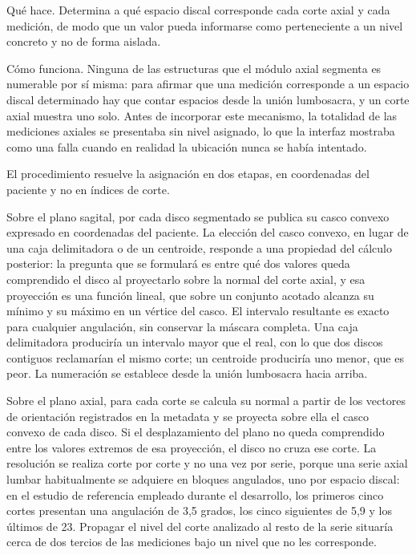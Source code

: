 Qué hace. Determina a qué espacio discal corresponde cada corte axial y cada medición, de modo que un valor pueda informarse como perteneciente a un nivel concreto y no de forma aislada.

Cómo funciona. Ninguna de las estructuras que el módulo axial segmenta es numerable por sí misma: para afirmar que una medición corresponde a un espacio discal determinado hay que contar espacios desde la unión lumbosacra, y un corte axial muestra uno solo. Antes de incorporar este mecanismo, la totalidad de las mediciones axiales se presentaba sin nivel asignado, lo que la interfaz mostraba como una falla cuando en realidad la ubicación nunca se había intentado.

El procedimiento resuelve la asignación en dos etapas, en coordenadas del paciente y no en índices de corte.

Sobre el plano sagital, por cada disco segmentado se publica su casco convexo expresado en coordenadas del paciente. La elección del casco convexo, en lugar de una caja delimitadora o de un centroide, responde a una propiedad del cálculo posterior: la pregunta que se formulará es entre qué dos valores queda comprendido el disco al proyectarlo sobre la normal del corte axial, y esa proyección es una función lineal, que sobre un conjunto acotado alcanza su mínimo y su máximo en un vértice del casco. El intervalo resultante es exacto para cualquier angulación, sin conservar la máscara completa. Una caja delimitadora produciría un intervalo mayor que el real, con lo que dos discos contiguos reclamarían el mismo corte; un centroide produciría uno menor, que es peor. La numeración se establece desde la unión lumbosacra hacia arriba.

Sobre el plano axial, para cada corte se calcula su normal a partir de los vectores de orientación registrados en la metadata y se proyecta sobre ella el casco convexo de cada disco. Si el desplazamiento del plano no queda comprendido entre los valores extremos de esa proyección, el disco no cruza ese corte. La resolución se realiza corte por corte y no una vez por serie, porque una serie axial lumbar habitualmente se adquiere en bloques angulados, uno por espacio discal: en el estudio de referencia empleado durante el desarrollo, los primeros cinco cortes presentan una angulación de 3,5 grados, los cinco siguientes de 5,9 y los últimos de 23. Propagar el nivel del corte analizado al resto de la serie situaría cerca de dos tercios de las mediciones bajo un nivel que no les corresponde.

